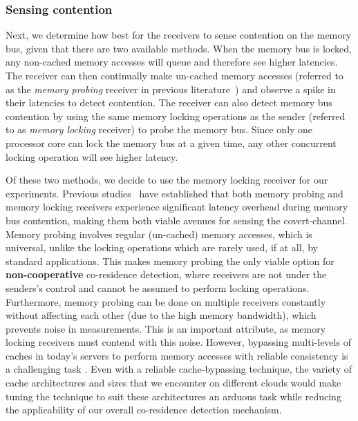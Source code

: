 \subsubsection{Sensing contention} 
Next, we determine how best for the receivers to sense contention on the memory
bus, given that there are two available methods. When the memory bus is locked,
any non-cached memory accesses will queue and therefore see higher latencies.
The receiver can then continually make un-cached memory accesses (referred to as
the \textit{memory probing} receiver in previous
literature~\cite{varadarajan2015}) and observe a spike in their latencies to
detect contention.  The receiver can also detect memory bus contention by using
the same memory locking operations as the sender (referred to as \textit{memory
locking} receiver) to probe the memory bus. Since only one processor core can
lock the memory bus at a given time, any other concurrent locking operation will
see higher latency. 

Of these two methods, we decide to use the memory locking receiver for our
experiments.  Previous studies~\cite{wuusenix2012,varadarajan2015} have
established that both memory probing and memory locking receivers experience
significant latency overhead during memory bus contention, making them both
viable avenues for sensing the covert-channel. Memory probing involves regular
(un-cached) memory accesses, which is universal, unlike the locking operations
which are rarely used, if at all, by standard applications. This makes memory
probing the only viable option for \textbf{non-cooperative} co-residence
detection, where receivers are not under the senders's control and cannot be assumed
to perform locking operations.  Furthermore, memory probing can be done on
multiple receivers constantly without affecting each other (due to the high
memory bandwidth), which prevents noise in measurements. This is an important
attribute, as memory locking receivers must contend with this noise. However,
bypassing multi-levels of caches in today's servers to perform memory accesses
with reliable consistency is a challenging task . Even
with a reliable cache-bypassing technique, the variety of cache architectures
and sizes that we encounter on different clouds would make tuning the technique
to suit these architectures an arduous task while reducing the applicability of
our overall co-residence detection mechanism. 


